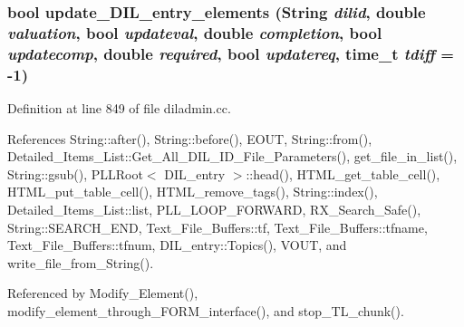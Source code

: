 \subsubsection{\setlength{\rightskip}{0pt plus 5cm}bool update\_\-DIL\_\-entry\_\-elements ({\bf String} {\em dilid}, double {\em valuation}, bool {\em updateval}, double {\em completion}, bool {\em updatecomp}, double {\em required}, bool {\em updatereq}, time\_\-t {\em tdiff} = -1)}\label{diladmin_8cc_a13}




Definition at line 849 of file diladmin.cc.

References String::after(), String::before(), EOUT, String::from(), Detailed\_\-Items\_\-List::Get\_\-All\_\-DIL\_\-ID\_\-File\_\-Parameters(), get\_\-file\_\-in\_\-list(), String::gsub(), PLLRoot$<$ DIL\_\-entry $>$::head(), HTML\_\-get\_\-table\_\-cell(), HTML\_\-put\_\-table\_\-cell(), HTML\_\-remove\_\-tags(), String::index(), Detailed\_\-Items\_\-List::list, PLL\_\-LOOP\_\-FORWARD, RX\_\-Search\_\-Safe(), String::SEARCH\_\-END, Text\_\-File\_\-Buffers::tf, Text\_\-File\_\-Buffers::tfname, Text\_\-File\_\-Buffers::tfnum, DIL\_\-entry::Topics(), VOUT, and write\_\-file\_\-from\_\-String().

Referenced by Modify\_\-Element(), modify\_\-element\_\-through\_\-FORM\_\-interface(), and stop\_\-TL\_\-chunk().



